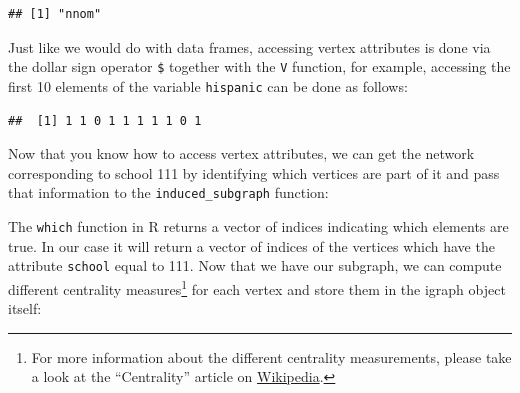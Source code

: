 \documentclass[]{book}
\newenvironment{Shaded}{\begin{snugshade}}{\end{snugshade}}
\newcommand{\KeywordTok}[1]{\textcolor[rgb]{0.13,0.29,0.53}{\textbf{#1}}}
\newcommand{\DataTypeTok}[1]{\textcolor[rgb]{0.13,0.29,0.53}{#1}}
\newcommand{\DecValTok}[1]{\textcolor[rgb]{0.00,0.00,0.81}{#1}}
\newcommand{\StringTok}[1]{\textcolor[rgb]{0.31,0.60,0.02}{#1}}
\newcommand{\CommentTok}[1]{\textcolor[rgb]{0.56,0.35,0.01}{\textit{#1}}}
\newcommand{\OperatorTok}[1]{\textcolor[rgb]{0.81,0.36,0.00}{\textbf{#1}}}
\newcommand{\NormalTok}[1]{#1}
\let\rmarkdownfootnote\footnote%
\def\footnote{\protect\rmarkdownfootnote}
\theoremstyle{definition}
\theoremstyle{definition}
\theoremstyle{definition}
\theoremstyle{remark}
\begin{document}
\begin{verbatim}
## [1] "nnom"
\end{verbatim}

Just like we would do with data frames, accessing vertex attributes is
done via the dollar sign operator \texttt{\$} together with the
\texttt{V} function, for example, accessing the first 10 elements of the
variable \texttt{hispanic} can be done as follows:

\begin{Shaded}
\end{Shaded}

\begin{verbatim}
##  [1] 1 1 0 1 1 1 1 1 0 1
\end{verbatim}

Now that you know how to access vertex attributes, we can get the
network corresponding to school 111 by identifying which vertices are
part of it and pass that information to the \texttt{induced\_subgraph}
function:

\begin{Shaded}
\end{Shaded}

The \texttt{which} function in R returns a vector of indices indicating
which elements are true. In our case it will return a vector of indices
of the vertices which have the attribute \texttt{school} equal to 111.
Now that we have our subgraph, we can compute different centrality
measures\footnote{For more information about the different centrality
  measurements, please take a look at the ``Centrality'' article on
  \href{https://en.wikipedia.org/wiki/Centrality}{Wikipedia}.} for each
vertex and store them in the igraph object itself:
\end{document}
